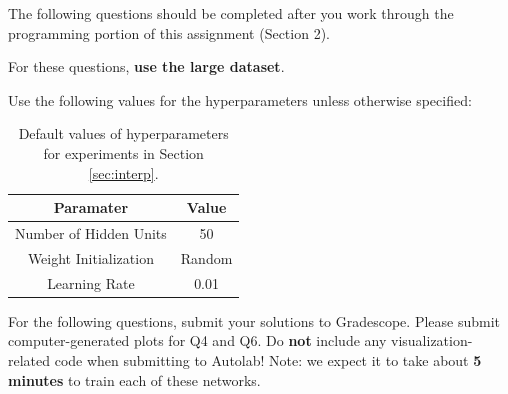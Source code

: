 \documentclass[11pt]{article}
\numberwithin{equation}{section} %
\numberwithin{figure}{section} %
\numberwithin{table}{section} %
\begin{document}
The following questions should be completed after you work through the programming portion of this assignment (Section 2).

For these questions, \textbf{use the large dataset}.

Use the following values for the hyperparameters unless otherwise specified:

\begin{table}[H]
    \centering
    \begin{tabular}{|c|c|}
        \hline
        \textbf{Paramater} & \textbf{Value} \\
        \hline
        Number of Hidden Units & 50 \\
        \hline
        Weight Initialization & {\sc Random} \\
        \hline
        Learning Rate & 0.01 \\
        \hline
        
    \end{tabular}
    \caption{Default values of hyperparameters for experiments in Section \ref{sec:interp}.}
    \label{tab:params}
\end{table}

 For the following questions, submit your solutions to Gradescope. Please submit computer-generated plots for Q4 and Q6. Do {\bf not} include any visualization-related code when submitting to Autolab! Note: we expect it to take about {\bf 5 minutes} to train each of these networks.
 
\end{document}
